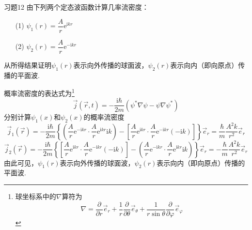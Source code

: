 \begin{question}{习题12}
    由下列两个定态波函数计算几率流密度：
    \begin{enumerate}
        \item[(1)] $\psi_1(r)=\dfrac{A}{r}\mathrm{e}^{\mathrm{i}kr}$
        \item[(2)] $\psi_2(r)=\dfrac{A}{r}\mathrm{e}^{-\mathrm{i}kr}$
    \end{enumerate}
    从所得结果证明$\psi_1(r)$表示向外传播的球面波，$\psi_2(r)$表示向内（即向原点）传播的平面波.
\end{question}
\begin{solution}
    概率流密度的表达式为\footnote{球坐标系中的$\nabla$算符为$$\nabla=\frac{\partial }{\partial r}\vec{e}_r + \frac{1}{r}\frac{\partial }{\partial \theta}\vec{e}_{\theta} + \frac{1}{r\sin\theta}\frac{\partial }{\partial \varphi}\vec{e}_{\varphi}$$}
    \begin{equation}\label{概率流密度}
        \vec{j}(\vec{r}, t) = -\frac{\mathrm{i}\hbar}{2m}\left(\psi^*\nabla\psi-\psi\nabla\psi^*\right)
    \end{equation}
    分别计算$\psi_1(x)$和$\psi_2(x)$的概率流密度
    $$
        \vec{j}_1(\vec{r}) = -\frac{\mathrm{i}\hbar}{2m}\left\{\left(\frac{A}{r}\mathrm{e}^{-\mathrm{i}kr}\cdot\frac{A}{r}\mathrm{e}^{\mathrm{i}kr}\mathrm{i}k\right) - \left[\frac{A}{r}\mathrm{e}^{\mathrm{i}kr}\cdot\frac{A}{r}\mathrm{e}^{-\mathrm{i}kr}(-\mathrm{i}k)\right]\right\}\vec{e}_r
        =\frac{\hbar}{m}\frac{A^2k}{r^2}\vec{e}_r
    $$
    $$
        \vec{j}_2(\vec{r}) = -\frac{\mathrm{i}\hbar}{2m}\left\{\left[\frac{A}{r}\mathrm{e}^{\mathrm{i}kr}\cdot\frac{A}{r}\mathrm{e}^{-\mathrm{i}kr}(-\mathrm{i}k)\right]-\left(\frac{A}{r}\mathrm{e}^{-\mathrm{i}kr}\cdot\frac{A}{r}\mathrm{e}^{\mathrm{i}kr}\mathrm{i}k\right)\right\}\vec{e}_r
        =-\frac{\hbar}{m}\frac{A^2k}{r^2}\vec{e}_r
    $$
    由此可见，$\psi_1(r)$表示向外传播的球面波，$\psi_2(r)$表示向内（即向原点）传播的平面波.
\end{solution}
